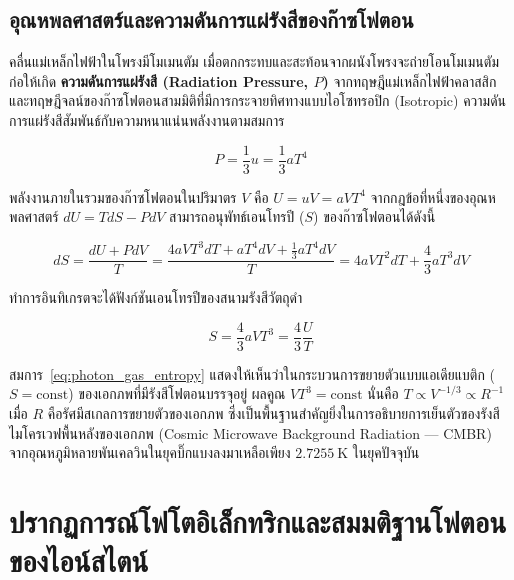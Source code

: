 \subsection{อุณหพลศาสตร์และความดันการแผ่รังสีของก๊าซโฟตอน}

คลื่นแม่เหล็กไฟฟ้าในโพรงมีโมเมนตัม เมื่อตกกระทบและสะท้อนจากผนังโพรงจะถ่ายโอนโมเมนตัม ก่อให้เกิด \textbf{ความดันการแผ่รังสี (Radiation Pressure, $P$)} จากทฤษฎีแม่เหล็กไฟฟ้าคลาสสิกและทฤษฎีจลน์ของก๊าซโฟตอนสามมิติที่มีการกระจายทิศทางแบบไอโซทรอปิก (Isotropic) ความดันการแผ่รังสีสัมพันธ์กับความหนาแน่นพลังงานตามสมการ

\begin{equation}
P = \frac{1}{3}u = \frac{1}{3}a T^4
\label{eq:radiation_pressure}
\end{equation}

พลังงานภายในรวมของก๊าซโฟตอนในปริมาตร $V$ คือ $U = u V = a V T^4$ จากกฎข้อที่หนึ่งของอุณหพลศาสตร์ $dU = T dS - P dV$ สามารถอนุพัทธ์เอนโทรปี ($S$) ของก๊าซโฟตอนได้ดังนี้

\begin{equation}
dS = \frac{dU + P dV}{T} = \frac{4 a V T^3 dT + a T^4 dV + \frac{1}{3}a T^4 dV}{T} = 4 a V T^2 dT + \frac{4}{3}a T^3 dV
\end{equation}

ทำการอินทิเกรตจะได้ฟังก์ชันเอนโทรปีของสนามรังสีวัตถุดำ

\begin{equation}
S = \frac{4}{3}a V T^3 = \frac{4}{3}\frac{U}{T}
\label{eq:photon_gas_entropy}
\end{equation}

สมการ~\eqref{eq:photon_gas_entropy} แสดงให้เห็นว่าในกระบวนการขยายตัวแบบแอเดียแบติก ($S = \text{const}$) ของเอกภพที่มีรังสีโฟตอนบรรจุอยู่ ผลคูณ $V T^3 = \text{const}$ นั่นคือ $T \propto V^{-1/3} \propto R^{-1}$ เมื่อ $R$ คือรัศมีสเกลการขยายตัวของเอกภพ ซึ่งเป็นพื้นฐานสำคัญยิ่งในการอธิบายการเย็นตัวของรังสีไมโครเวฟพื้นหลังของเอกภพ (Cosmic Microwave Background Radiation --- CMBR) จากอุณหภูมิหลายพันเคลวินในยุคบิ๊กแบงลงมาเหลือเพียง $2.7255~\text{K}$ ในยุคปัจจุบัน

\section{ปรากฏการณ์โฟโตอิเล็กทริกและสมมติฐานโฟตอนของไอน์สไตน์}

